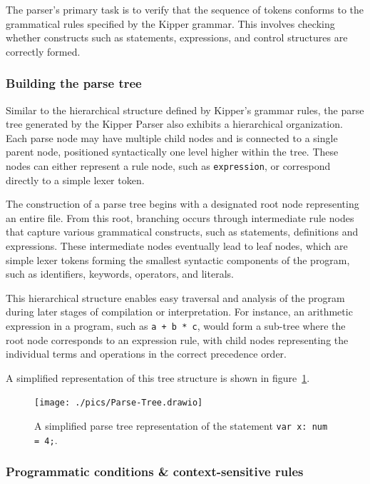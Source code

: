 The parser's primary task is to verify that the sequence of tokens conforms to the grammatical rules specified by the Kipper grammar. This involves checking whether constructs such as statements, expressions, and control structures are correctly formed.

\subsubsection{Building the parse tree}

Similar to the hierarchical structure defined by Kipper's grammar rules, the parse tree generated by the Kipper Parser also exhibits a hierarchical organization. Each parse node may have multiple child nodes and is connected to a single parent node, positioned syntactically one level higher within the tree. These nodes can either represent a rule node, such as \lstinline|expression|, or correspond directly to a simple lexer token.

The construction of a parse tree begins with a designated root node representing an entire file. From this root, branching occurs through intermediate rule nodes that capture various grammatical constructs, such as statements, definitions and expressions. These intermediate nodes eventually lead to leaf nodes, which are simple lexer tokens forming the smallest syntactic components of the program, such as identifiers, keywords, operators, and literals.

This hierarchical structure enables easy traversal and analysis of the program during later stages of compilation or interpretation. For instance, an arithmetic expression in a program, such as \lstinline|a + b * c|, would form a sub-tree where the root node corresponds to an expression rule, with child nodes representing the individual terms and operations in the correct precedence order.

A simplified representation of this tree structure is shown in figure~\ref{fig:implementation:parse-tree}.

\begin{figure}[h!]
	\centering
	\texttt{[image: ./pics/Parse-Tree.drawio]}
	\caption{A simplified parse tree representation of the statement \lstinline|var x: num = 4;|.}
	\label{fig:implementation:parse-tree}
\end{figure}

\subsubsection{Programmatic conditions \& context-sensitive rules}


